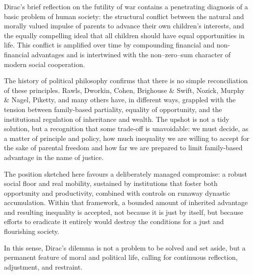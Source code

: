 \documentclass[%
  reprint,
  superscriptaddress,
  amsmath,amssymb,
  pra,
  floatfix,
  longbibliography
]{revtex4-2}
\begin{document}
Dirac's brief reflection on the futility of war contains a penetrating
diagnosis of a basic problem of human society: the structural conflict
between the natural and morally valued impulse of parents to advance
their own children's interests, and the equally compelling ideal that
all children should have equal opportunities in life.  This conflict is
amplified over time by compounding financial and non-financial
advantages and is intertwined with the non--zero--sum character of
modern social cooperation.

The history of political philosophy confirms that there is no simple
reconciliation of these principles.  Rawls, Dworkin, Cohen, Brighouse
\& Swift, Nozick, Murphy \& Nagel, Piketty, and many others have, in
different ways, grappled with the tension between family-based
partiality, equality of opportunity, and the institutional regulation of
inheritance and wealth.  The upshot is not a tidy solution, but a
recognition that some trade-off is unavoidable: we must decide, as a
matter of principle and policy, how much inequality we are willing to
accept for the sake of parental freedom and how far we are prepared to
limit family-based advantage in the name of justice.

The position sketched here favours a deliberately managed compromise:
a robust social floor and real mobility, sustained by institutions that
foster both opportunity and productivity, combined with controls on
runaway dynastic accumulation.  Within that framework, a bounded amount
of inherited advantage and resulting inequality is accepted, not because
it is just by itself, but because efforts to eradicate it entirely would
destroy the conditions for a just and flourishing society.

In this sense, Dirac's dilemma is not a problem to be solved and set
aside, but a permanent feature of moral and political life, calling for
continuous reflection, adjustment, and restraint.



\end{document}
